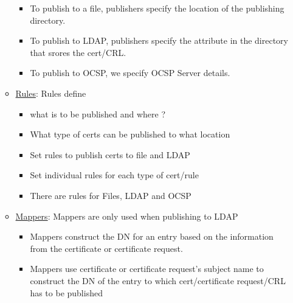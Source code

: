 \documentclass[a4paper]{article}
\begin{document}
\begin{itemize}
\begin{itemize}
\begin{itemize}
                            \item To publish to a file, publishers specify the location of the publishing directory.
                            \item To publish to LDAP, publishers specify the attribute in the directory that srores the cert/CRL.
                            \item To publish to OCSP, we specify OCSP Server details. 
                        \end{itemize}
                    \item \underline{Rules}: Rules define 
                        \begin{itemize}
                            \item what is to be published and where ?
                            \item What type of certs can be published to what location
                            \item Set rules to publish certs to file and LDAP
                            \item Set individual rules for each type of cert/rule
                            \item There are rules for Files, LDAP and OCSP
                        \end{itemize}
                    \item \underline{Mappers}: Mappers are only used when publishing to LDAP
                        \begin{itemize}
                            \item Mappers construct the DN for an entry based on the information
                                from the certificate or certificate request. 
                            \item Mappers use certificate or certificate request's subject name to
                                construct the DN of the entry to which cert/certificate request/CRL has to be published
                        \end{itemize}
            \end{itemize}
    \end{itemize}
\end{document}

